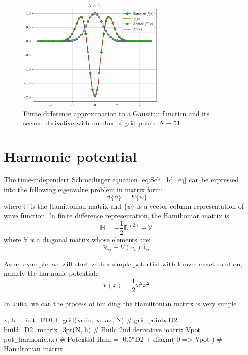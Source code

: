 \begin{figure}[H]
{\center
\includegraphics[width=0.65\textwidth]{../codes/FD1d/IMG_gaussian_51.pdf}
\par}
\caption{Finite difference approximation to a Gaussian function and its second derivative with
number of grid points $N=51$}
\end{figure}


\section{Harmonic potential}

The time-independent Schroedinger equation \eqref{eq:Sch_1d_eq} can be expressed into
the following eigenvalue problem in matrix form:
\begin{equation}
\mathbb{H}\{ \psi \} = E \{ \psi \}
\end{equation}
where $\mathbb{H}$ is the Hamiltonian matrix and $\{ \psi \}$ is a vector
column representation of wave function.
In finite difference representation, the Hamiltonian matrix is
\begin{equation}
\mathbb{H} = -\frac{1}{2}\mathbb{D}^{(2)} + \mathbb{V}
\end{equation}
where $\mathbb{V}$ is a diagonal matrix whose elements are:
\begin{equation}
\mathbb{V}_{ij} = V(x_{i})\delta_{ij}
\end{equation}

As an example, we will start with a simple potential with known exact solution,
namely the harmonic potential:
\begin{equation}
V(x) = \frac{1}{2}\omega^2 x^2
\end{equation}

In Julia, we can the process of building the Hamiltonian matrix is very simple
\begin{juliacode}
x, h = init_FD1d_grid(xmin, xmax, N) # grid points
D2 = build_D2_matrix_3pt(N, h)       # Build 2nd derivative matrix
Vpot = pot_harmonic.(x)              # Potential
Ham = -0.5*D2 + diagm( 0 => Vpot )   # Hamiltonian matrix
\end{juliacode}

